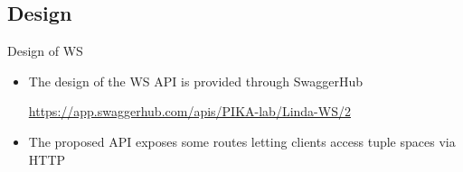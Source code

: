 \documentclass[presentation]{beamer}\mode<presentation>{\usetheme{AMSCesenaPurpleAndGold}}
\begin{document}
\subsection{Design}

\begin{frame}[allowframebreaks]{Design of \linda{} WS}
    \begin{itemize}
        \item The design of the \linda{} WS \alert{API} is provided through SwaggerHub
        \begin{center}
            \url{https://app.swaggerhub.com/apis/PIKA-lab/Linda-WS/2}
        \end{center}
        
        \vspace{.3cm}
        
        \item The proposed API exposes some routes letting clients access tuple spaces via HTTP
        
        \framebreak
        
        
        
            
            
            

\end{itemize}
\end{frame}
\end{document}
